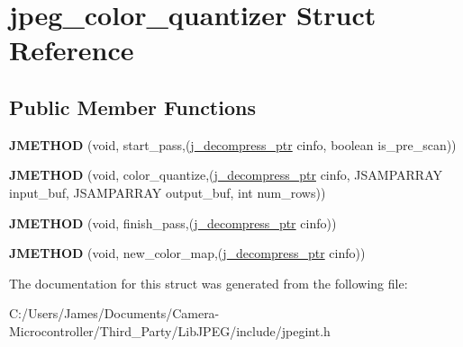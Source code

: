 \hypertarget{structjpeg__color__quantizer}{}\section{jpeg\+\_\+color\+\_\+quantizer Struct Reference}
\label{structjpeg__color__quantizer}
\subsection*{Public Member Functions}
\begin{DoxyCompactItemize}
\item 
\mbox{\label{structjpeg__color__quantizer_af1124bf62a03772e4beba663df2040de}} 
{\bfseries J\+M\+E\+T\+H\+OD} (void, start\+\_\+pass,(\hyperlink{structjpeg__decompress__struct}{j\+\_\+decompress\+\_\+ptr} cinfo, boolean is\+\_\+pre\+\_\+scan))
\item 
\mbox{\label{structjpeg__color__quantizer_a9ee11f4e3cfb5cb7c54f90cc41078302}} 
{\bfseries J\+M\+E\+T\+H\+OD} (void, color\+\_\+quantize,(\hyperlink{structjpeg__decompress__struct}{j\+\_\+decompress\+\_\+ptr} cinfo, J\+S\+A\+M\+P\+A\+R\+R\+AY input\+\_\+buf, J\+S\+A\+M\+P\+A\+R\+R\+AY output\+\_\+buf, int num\+\_\+rows))
\item 
\mbox{\label{structjpeg__color__quantizer_a1c8ad1b3eb699d5702cf0164833e6e26}} 
{\bfseries J\+M\+E\+T\+H\+OD} (void, finish\+\_\+pass,(\hyperlink{structjpeg__decompress__struct}{j\+\_\+decompress\+\_\+ptr} cinfo))
\item 
\mbox{\label{structjpeg__color__quantizer_aa97e76dcd612f883e27aae0305ca64a1}} 
{\bfseries J\+M\+E\+T\+H\+OD} (void, new\+\_\+color\+\_\+map,(\hyperlink{structjpeg__decompress__struct}{j\+\_\+decompress\+\_\+ptr} cinfo))
\end{DoxyCompactItemize}


The documentation for this struct was generated from the following file\+:\begin{DoxyCompactItemize}
\item 
C\+:/\+Users/\+James/\+Documents/\+Camera-\/\+Microcontroller/\+Third\+\_\+\+Party/\+Lib\+J\+P\+E\+G/include/jpegint.\+h\end{DoxyCompactItemize}
